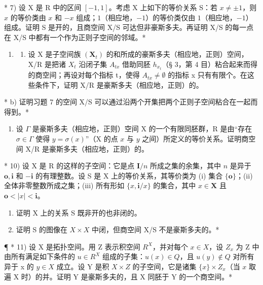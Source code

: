 * 7) 设 X 是 R 中的区间 \([-1, 1]\)。考虑 X 上如下的等价关系 S：若 \(x \neq \pm 1\)，则 \(x\) 的等价类由 \(x\) 和 \(-x\) 组成；\(1\)（相应地，\(-1\)）的等价类仅由 \(1\)（相应地，\(-1\)）组成。证明 S 是开的，且商空间 X/S 可达但非豪斯多夫。再证明 X/S 的每一点在 X/S 中都有一个作为正则子空间的邻域。*

\begin{enumerate}
\def\labelenumi{\arabic{enumi})}
\setcounter{enumi}{7}
\tightlist
\item
  \begin{enumerate}
  \def\labelenumii{\alph{enumii})}
  \tightlist
  \item
    设 X 是子空间族 \((\mathbf{X}_{t})\) 的和所成的豪斯多夫（相应地，正则）空间，X/R 是把诸 \(X_{t}\) 沿闭子集 \(A_{tx}\) 借助同胚 \(h_{x_{t}}\)（§ 3，第 4 目）粘合起来而得的商空间；再设对每个指标 t，使得 \(A_{tx} \neq \emptyset\) 的指标 x 只有有限个。在这些条件下，证明 X/R 是豪斯多夫（相应地，正则）的。
  \end{enumerate}
\end{enumerate}

* b) 证明习题 7 的空间 X/S 可以通过沿两个开集把两个正则子空间粘合在一起而得到。*

\begin{enumerate}
\def\labelenumi{\arabic{enumi})}
\setcounter{enumi}{8}
\tightlist
\item
  设 \(\Gamma\) 是豪斯多夫（相应地，正则）空间 X 的一个有限同胚群，R 是由“存在 \(\sigma \in \Gamma\) 使得 \(y = \sigma(x)\)”（X 的点 \(x\) 与 \(y\) 之间）所定义的等价关系。证明商空间 X/R 是豪斯多夫（相应地，正则）的。
\end{enumerate}

* 10) 设 X 是 R 的这样的子空间：它是点 \(\mathbf{I} / n\) 所成之集的余集，其中 \(n\) 是异于 \(\mathbf{o}, \mathbf{i}\) 和 \(-\mathbf{i}\) 的有理整数。设 S 是 X 上的等价关系，其等价类为 (i) 集合 \(\{\mathbf{o}\}\)；(ii) 全体非零整数所成之集；(iii) 所有形如 \(\{x, \mathbf{i} / x\}\) 的集合，其中 \(x \in \mathbf{X}\) 且 \(\mathbf{o} < |x| < \mathbf{i}\)。

\begin{enumerate}
\def\labelenumi{\alph{enumi})}
\item
  证明 X 上的关系 S 既非开的也非闭的。
\item
  证明 S 的图像在 \(X \times X\) 中闭，但商空间 X/S 不是豪斯多夫的。*
\end{enumerate}

¶ * 11) 设 X 是拓扑空间。用 Z 表示积空间 \(R^{X}\)，并对每个 \(x \in X\)，设 \(Z_{x}\) 为 Z 中由所有满足如下条件的 \(u \in R^{X}\) 组成的子集：\(u(x) \in Q\)，且 \(u(y) \notin Q\) 对所有异于 x 的 \(y \in X\) 成立。设 Y 是积 \(X \times Z\) 的子空间，它是诸集 \(\{x\} \times Z_x\)（当 \(x\) 取遍 X 时）的并。证明 Y 是豪斯多夫的，且 X 同胚于 Y 的一个商空间。*

